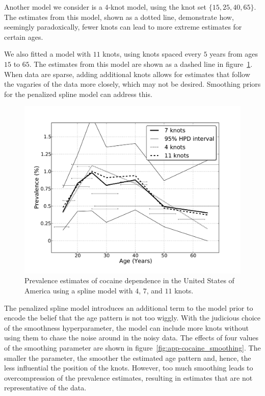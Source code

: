 Another model we consider is a $4$-knot model, using the knot set $\{15, 25,
40, 65\}$.  The estimates from this model, shown as a dotted line,
demonstrate how, seemingly paradoxically, fewer knots can lead to more
extreme estimates for certain ages.

We also fitted a model with $11$ knots, using knots spaced every $5$ years from
ages $15$ to $65$.
The estimates from this model are shown as a dashed line in
figure~\ref{fig:app-cocaine_knots}.  When data are sparse, adding
additional knots allows for estimates that follow the vagaries of the
data more closely, which may not be desired.  Smoothing priors for the
penalized spline model can address this.

    \begin{figure}[h]
        \begin{center}
            \includegraphics[width=\textwidth]{applications/cocaine_dependence-knots.pdf}
            \caption{Prevalence estimates of cocaine dependence in the United
              States of America using a spline model with $4$, $7$, and $11$ knots. }
        \label{fig:app-cocaine_knots}
        \end{center}
    \end{figure}

The penalized spline model introduces an additional term to the model
prior to encode the belief that the age pattern is not too wiggly.
With the judicious choice of the smoothness hyperparameter, the model
can include more knots without using them to chase the noise around in
the noisy data.  The effects of four values of the smoothing parameter
are shown in figure~\ref{fig:app-cocaine_smoothing}.  The smaller the
parameter, the smoother the estimated age pattern and, hence, the less
influential the position of the knots.  However, too much smoothing
leads to overcompression of the prevalence estimates, resulting in estimates
that are not representative of the data.

